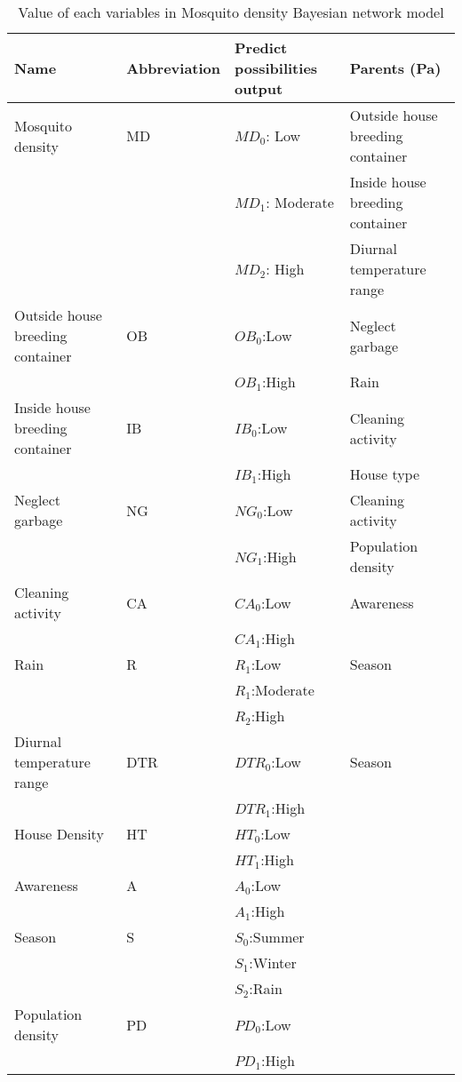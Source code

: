 \documentclass[a4paper,9pt,nil]{article}
\begin{document}
	\begin{table}[!htbp]
		\centering
		\normalsize
		\begin{tabular}{|l|p{2cm}|l|l|}
			\hline
			Name & Abbreviation & Predict possibilities output & Parents (Pa)\\
			\hline
			Mosquito density & MD &  $MD_0$: Low &  Outside house breeding container\\
			&  &  $MD_1$: Moderate &  Inside house breeding container\\
			&  &  $MD_2$: High &  Diurnal temperature range\\
			\hline
			Outside house breeding container & OB &  $OB_0$:Low &  Neglect garbage\\
			&  &  $OB_1$:High &  Rain\\
			\hline
			Inside house breeding container & IB &  $IB_0$:Low &  Cleaning activity\\
			&  &  $IB_1$:High &  House type \\
			\hline
			Neglect garbage & NG &  $NG_0$:Low &  Cleaning activity\\
			&  &  $NG_1$:High &  Population density\\
			\hline
			Cleaning activity & CA &  $CA_0$:Low &  Awareness \\
			&  &  $CA_1$:High & \\
			\hline
			Rain & R &  $R_1$:Low &  Season \\
			&  &  $R_1$:Moderate & \\
			&  &  $R_2$:High & \\
			\hline
			Diurnal temperature range & DTR &  $DTR_0$:Low &  Season \\
			&  &  $DTR_1$:High & \\
			\hline
			House Density & HT &  $HT_0$:Low & \\
			&  &  $HT_1$:High & \\
			\hline
			Awareness & A &  $A_0$:Low & \\
			&  &  $A_1$:High & \\
			\hline
			Season & S &  $S_0$:Summer & \\
			&  &  $S_1$:Winter & \\
			&  &  $S_2$:Rain & \\
			\hline
			Population density & PD & $PD_0$:Low & \\
			&  &  $PD_1$:High & \\
			\hline
		\end{tabular}
		\caption{Value of each variables in Mosquito density Bayesian network model}
	\end{table}
\end{document}
